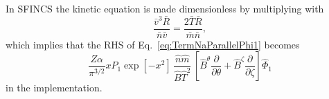 \documentclass[12pt]{article}
\newcommand{\p}{\partial}
\newcommand{\na}{\nabla}
\begin{document}
\begin{appendices}

\noindent In SFINCS the kinetic equation is made dimensionless by multiplying with
\[
\frac{\bar{v}^3 \bar{R}}{\bar{n} \bar{v}} = \frac{2 \bar{T} \bar{R}}{\bar{m} \bar{n}},
\]
which implies that the RHS of Eq.~\ref{eq:TermNaParallelPhi1} becomes
\begin{equation}
 \frac{Z \alpha}{\pi^{3/2} } x P_1  \exp \left[- x^2\right] \, \frac{\hat{n} \hat{m}}{\hat{B} \hat{T}^2 }  \,  \left[ \hat{B}^{\theta} \frac{\p }{\p \theta} + \hat{B}^{\zeta} \frac{\p }{\p \zeta} \right] \hat{\Phi}_1
\label{eq:TermNaParallelPhi1SFINCS}
\end{equation}
in the implementation.



\end{appendices}
\end{document}
